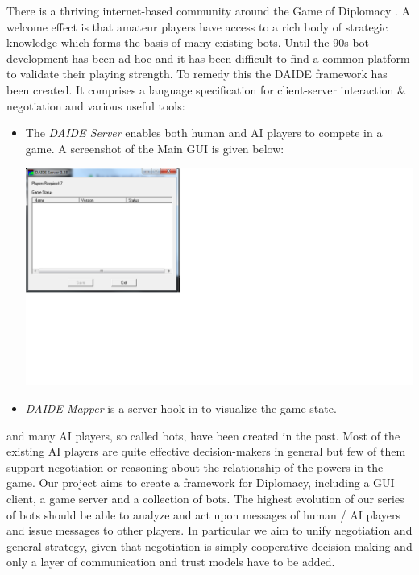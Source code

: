 \documentclass[pdftex,12pt,a4paper]{report}
\begin{document}
There is a thriving internet-based community around the Game of
Diplomacy \cite{DipArchive04} \cite{DipPouch04}. A welcome effect is
that amateur players have access to a rich body of strategic knowledge
which forms the basis of many existing bots. Until the 90s bot
development has been ad-hoc and it has been difficult to find a common
platform to validate their playing strength. To remedy this the DAIDE
framework \cite{Daide04} has been created. It comprises a language
specification for client-server interaction \cite{DAIDEsyntax10} \&
negotiation and various useful tools:

\begin{itemize}

\item The \textit{DAIDE Server} enables both human and AI players to
      compete in a game. A screenshot of the Main GUI is given below:

\includegraphics{./images/DAIDEServer.png}

\item \textit{DAIDE Mapper} is a server hook-in to visualize
      the game state.





\end{itemize}


 and many AI
players, so called bots, have been created in the past. Most of the
existing AI players are quite effective decision-makers in general but
few of them support negotiation or reasoning about the relationship of
the powers in the game. Our project aims to create a framework for
Diplomacy, including a GUI client, a game server and a collection of
bots. The highest evolution of our series of bots should be able to
analyze and act upon messages of human / AI players and issue messages
to other players. In particular we aim to unify negotiation and
general strategy, given that negotiation is simply 
cooperative decision-making and only a layer of communication and
trust models have to be added. \\
\end{document}
